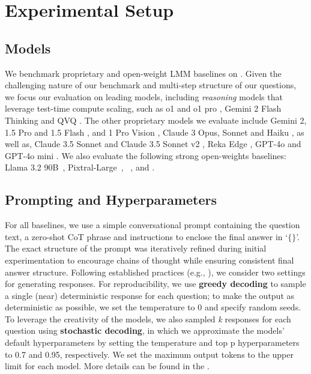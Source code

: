\section{Experimental Setup}
\label{sec:experimental_setup}

\subsection{Models}
\label{sec:baselines}

We benchmark \nmodelsevaluated proprietary and open-weight LMM baselines on \benchmarkName. Given the challenging nature of our benchmark and multi-step structure of our questions, we focus our evaluation on leading models, including \textit{reasoning} models that leverage test-time compute scaling, such as o1 and o1 pro \cite{openai2024o1}, Gemini 2 Flash Thinking \cite{google2024gemini2flash} and QVQ \cite{qvq-72b-preview}. The other proprietary models we evaluate include Gemini 2, 1.5 Pro and 1.5 Flash \cite{reid2024gemini}, and 1 Pro Vision \cite{team2023gemini}, Claude 3 Opus, Sonnet and Haiku \cite{anthropic2024claude}, as well as, Claude 3.5 Sonnet and Claude 3.5 Sonnet v2 \cite{sonnet35}, Reka Edge \cite{team2024reka}, GPT-4o and GPT-4o mini \cite{gpt4o}.
We also evaluate the following strong open-weights baselines: Llama 3.2 90B~\cite{dubey2024llama}, Pixtral-Large~\cite{agrawal2024pixtral}, \QwenLong~\cite{wang2024qwen2},  and \NVLMLong \cite{dai2024nvlm}.



\subsection{Prompting and Hyperparameters}

For all baselines, we use a simple conversational prompt containing the question text, a zero-shot CoT \cite{kojima2022large} phrase and instructions to enclose the final answer in `$\{\}$'. The exact structure of the prompt was iteratively refined during initial experimentation to encourage chains of thought while ensuring consistent final answer structure. Following established practices (e.g., \cite{zhang2024humaneval}), we consider two settings for generating responses. %
For reproducibility, we use \textbf{greedy decoding} to sample a single (near) deterministic response for each question; to make the output as deterministic as possible, we set the temperature to 0 and specify random seeds. To leverage the creativity of the models, we also sampled \textit{k} responses for each question using \textbf{stochastic decoding}, in which we approximate the models' default hyperparameters by setting the temperature and top p hyperparameters to 0.7 and 0.95, respectively. We set the maximum output tokens to the upper limit for each model. More details can be found in the .









